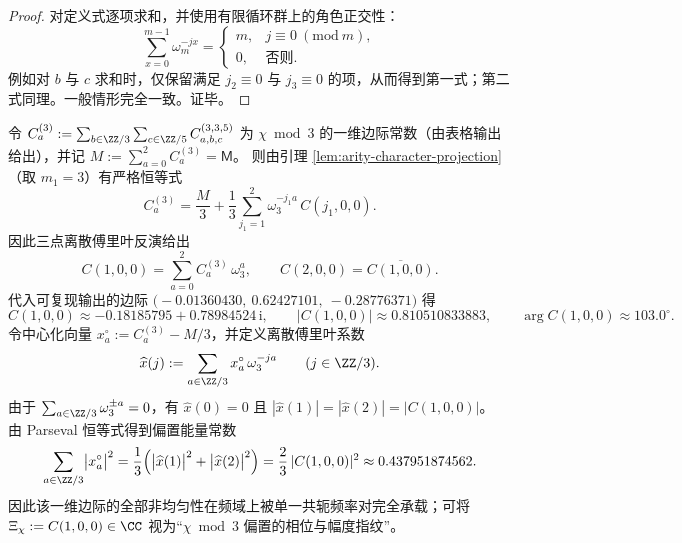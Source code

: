 \begin{proof}
对定义式逐项求和，并使用有限循环群上的角色正交性：
\[
\sum_{x=0}^{m-1}\omega_m^{-jx}
=
\begin{cases}
m,& j\equiv 0\ (\mathrm{mod}\ m),\\
0,& \text{否则}.
\end{cases}
\]
例如对 \(b\) 与 \(c\) 求和时，仅保留满足 \(j_2\equiv 0\) 与 \(j_3\equiv 0\) 的项，从而得到第一式；第二式同理。一般情形完全一致。证毕。
\end{proof}

\begin{corollary}\label{cor:arity-335-marginal-invert-chi}
令 \(C^{(3)}_a:=\sum_{b\in\ZZ/3}\sum_{c\in\ZZ/5}C^{(3,3,5)}_{a,b,c}\) 为 \(\chi\bmod 3\) 的一维边际常数（由表格输出给出），并记 \(M:=\sum_{a=0}^2 C^{(3)}_a=\mathsf{M}\)。
则由引理 \ref{lem:arity-character-projection}（取 \(m_1=3\)）有严格恒等式
\[
C^{(3)}_a=\frac{M}{3}+\frac13\sum_{j_1=1}^{2}\omega_3^{-j_1a}\,C(j_1,0,0).
\]
因此三点离散傅里叶反演给出
\[
C(1,0,0)=\sum_{a=0}^{2}C^{(3)}_a\,\omega_3^{a},\qquad
C(2,0,0)=\overline{C(1,0,0)}.
\]
代入可复现输出的边际 \(\bigl(-0.01360430,\ 0.62427101,\ -0.28776371\bigr)\) 得
\[
C(1,0,0)\approx -0.18185795+0.78984524\,\mathrm{i},
\qquad
|C(1,0,0)|\approx 0.810510833883,
\qquad
\arg C(1,0,0)\approx 103.0^\circ.
\]
令中心化向量 \(x_a^\circ:=C^{(3)}_a-M/3\)，并定义离散傅里叶系数
\[
\widehat x(j):=\sum_{a\in\ZZ/3}x_a^\circ\,\omega_3^{-ja}\qquad(j\in\ZZ/3).
\]
由于 \(\sum_{a\in\ZZ/3}\omega_3^{\pm a}=0\)，有 \(\widehat x(0)=0\) 且 \(|\widehat x(1)|=|\widehat x(2)|=|C(1,0,0)|\)。
由 Parseval 恒等式得到偏置能量常数
\[
\sum_{a\in\ZZ/3}\bigl|x_a^\circ\bigr|^2
=\frac13\Bigl(\bigl|\widehat x(1)\bigr|^2+\bigl|\widehat x(2)\bigr|^2\Bigr)
=\frac23\,|C(1,0,0)|^2
\approx 0.437951874562.
\]
因此该一维边际的全部非均匀性在频域上被单一共轭频率对完全承载；可将 \(\Xi_\chi:=C(1,0,0)\in\CC\) 视为“\(\chi\bmod 3\) 偏置的相位与幅度指纹”。
\end{corollary}

